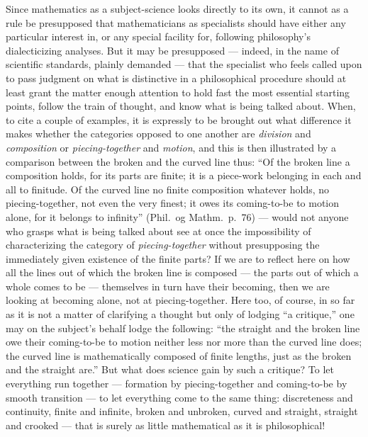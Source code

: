 \documentclass[12pt,a4paper]{book}
\begin{document}
Since mathematics as a subject-science looks directly to its own, it cannot as
a rule be presupposed that mathematicians as specialists should have either any
particular interest in, or any special facility for, following philosophy's
dialecticizing analyses. But it may be presupposed --- indeed, in the name of
scientific standards, plainly demanded --- that the specialist who feels called
upon to pass judgment on what is distinctive in a philosophical procedure
should at least grant the matter enough attention to hold fast the most
essential starting points, follow the train of thought, and know what is being
talked about. When, to cite a couple of examples, it is expressly to be brought
out what difference it makes whether the categories opposed to one another are
\emph{division} and \emph{composition} or \emph{piecing-together} and
\emph{motion}, and this is then illustrated by a comparison between the broken
and the curved line thus: ``Of the broken line a composition holds, for its
parts are finite; it is a piece-work belonging in each and all to finitude. Of
the
curved line no finite composition whatever holds, no piecing-together, not even
the very finest; it owes its coming-to-be to motion alone, for it belongs to
infinity'' (Phil.\ og Mathm.\ p.~76) --- would not anyone who grasps
what is being talked about see at once the impossibility of characterizing the
category of \emph{piecing-together} without presupposing the immediately given
existence of the finite parts? If we are to reflect here on how all the lines
out of which the broken line is composed --- the parts out of which a whole
comes to be --- themselves in turn have their becoming, then we are looking at
becoming alone, not at piecing-together. Here too, of course, in so far as it
is not a matter of clarifying a thought but only of lodging ``a critique,'' one
may on the subject's behalf lodge the following: ``the straight and the broken
line owe their coming-to-be to motion neither less nor more than the curved
line does; the curved line is mathematically composed of finite lengths, just
as the broken and the straight are.'' But what does science gain by such a
critique? To let everything run together --- formation by piecing-together and
coming-to-be by smooth transition --- to let everything come to the same thing:
discreteness and continuity, finite and infinite, broken and unbroken, curved
and straight, straight and crooked --- that is surely as little mathematical as
it is philosophical!
\end{document}
